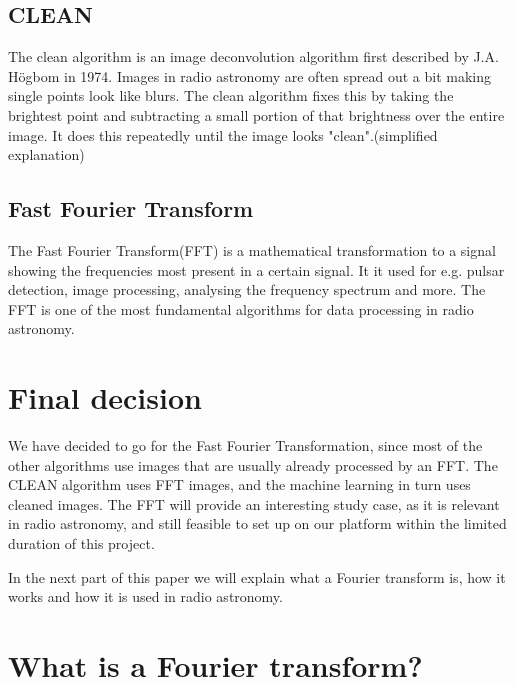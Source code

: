 \documentclass[11pt, A4, oneside]{article}
\begin{document}
\newpage

\subsection{CLEAN}

The clean algorithm is an image deconvolution algorithm first described by J.A. Högbom in 1974.\cite{CLEAN} Images in radio astronomy are often spread out a bit making single points look like blurs. The clean algorithm fixes this by taking the brightest point and subtracting a small portion of that brightness over the entire image. It does this repeatedly until the image looks "clean".(simplified explanation)

\subsection{Fast Fourier Transform}

The Fast Fourier Transform(FFT) is a mathematical transformation to a signal showing the frequencies most present in a certain signal. It it used for e.g. pulsar detection, image processing, analysing the frequency spectrum and more. The FFT is one of the most fundamental algorithms for data processing in radio astronomy. 

\section{Final decision}

We have decided to go for the Fast Fourier Transformation, since most of the other algorithms use images that are usually already processed by an FFT. The CLEAN algorithm uses FFT images, and the machine learning in turn uses cleaned images. The FFT will provide an interesting study case, as it is relevant in radio astronomy, and still feasible to set up on our platform within the limited duration of this project.    \\
\par
In the next part of this paper we will explain what a Fourier transform is, how it works and how it is used in radio astronomy. 
\newpage

\section{What is a Fourier transform?}
\end{document}

